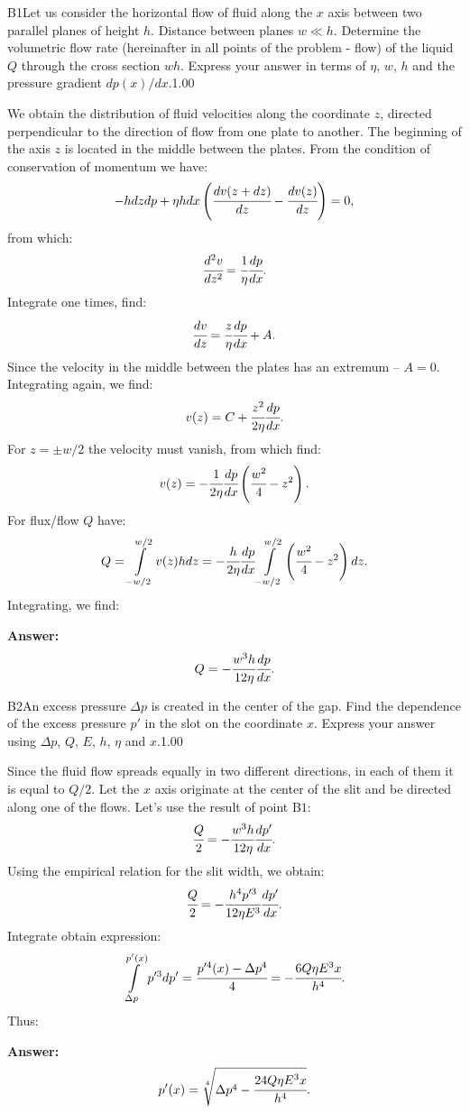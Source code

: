 \documentclass[11pt,a4paper]{article}
\begin{document}
\begin{solcard}{B1}{Let us consider the horizontal flow of fluid along the $x$ axis between two parallel planes of height $h$. Distance between planes $w\ll{h}$. Determine the volumetric flow rate (hereinafter in all points of the problem - flow) of the liquid $Q$ through the cross section $wh$. Express your answer in terms of $\eta$, $w$, $h$ and the pressure gradient $dp(x)/dx$.}{1.00}

We obtain the distribution of fluid velocities along the coordinate $z$, directed perpendicular to the direction of flow from one plate to another. The beginning of the axis $z$ is located in the middle between the plates. From the condition of conservation of momentum we have: $$-hdzdp+\eta hdx\left(\cfrac{dv(z+dz)}{dz}-\cfrac{dv(z)}{dz}\right)=0{,} $$from which: $$\cfrac{d^2v}{dz^2}=\cfrac{1}{\eta}\cfrac{dp}{dx}{.} $$Integrate one times, find: $$\cfrac{dv}{dz}=\cfrac{z}{\eta}\cfrac{dp}{dx}+A{.} $$Since the velocity in the middle between the plates has an extremum -- $A=0$. Integrating again, we find: $$v(z)=C+\cfrac{z^2}{2\eta}\cfrac{dp}{dx}{.} $$For $z=\pm w/2$ the velocity must vanish, from which find: $$v(z)=-\cfrac{1}{2\eta}\cfrac{dp}{dx}\left(\cfrac{w^2}{4}-z^2\right){.} $$For flux/flow $Q$ have: $$Q=\int\limits_{-w/2}^{w/2}v(z)hdz=-\cfrac{h}{2\eta}\cfrac{dp}{dx}\int\limits_{-w/2}^{w/2}\left(\cfrac{w^2}{4}-z^2\right)dz{.} $$Integrating, we find:

\par\smallskip\noindent\textbf{Answer:} $$Q=-\cfrac{w^3h}{12\eta}\cfrac{dp}{dx}{.} $$
\end{solcard}

\begin{solcard}{B2}{An excess pressure $\Delta p$ is created in the center of the gap. Find the dependence of the excess pressure $p'$ in the slot on the coordinate $x$. Express your answer using $\Delta{p}$, $Q$, $E$, $h$, $\eta$ and $x$.}{1.00}

Since the fluid flow spreads equally in two different directions, in each of them it is equal to $Q/2$. Let the $x$ axis originate at the center of the slit and be directed along one of the flows. Let's use the result of point $\mathrm{B1}$: $$\cfrac{Q}{2}=-\cfrac{w^3h}{12\eta}\cfrac{dp'}{dx}{.} $$Using the empirical relation for the slit width, we obtain: $$\cfrac{Q}{2}=-\cfrac{h^4p'^3}{12\eta E^3}\cfrac{dp'}{dx}{.} $$Integrate obtain expression: $$\int\limits_{\Delta{p}}^{p'(x)}p'^3dp'=\cfrac{p'^4(x)-\Delta{p}^4}{4}=-\cfrac{6Q\eta E^3x}{h^4}{.} $$Thus:

\par\smallskip\noindent\textbf{Answer:} $$p'(x)=\sqrt[4]{\Delta{p}^4-\cfrac{24Q\eta E^3x}{h^4}}{.} $$
\end{solcard}
\end{document}

